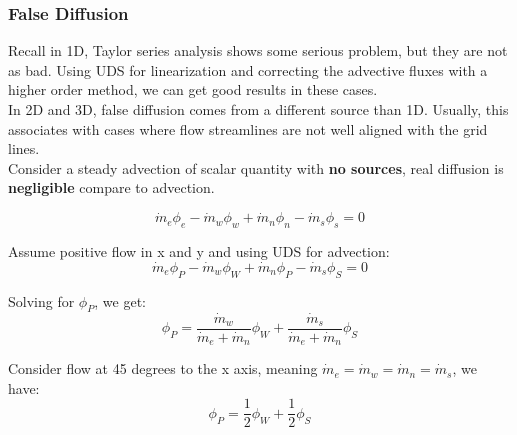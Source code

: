 \documentclass[11pt]{article}
\begin{document}
\subsubsection{False Diffusion}
\label{sec:orge3c6328}
Recall in 1D, Taylor series analysis shows some serious problem, but they are not as bad. Using
UDS for linearization and correcting the advective fluxes with a higher order method, we can get
good results in these cases.\\

In 2D and 3D, false diffusion comes from a different source than 1D. Usually, this associates with
cases where flow streamlines are not well aligned with the grid lines. \\

Consider a steady advection of scalar quantity with \textbf{no sources}, real diffusion is \textbf{negligible} compare
to advection.

\begin{equation*}
\dot{m}_e \phi_e - \dot{m}_w \phi_w + \dot{m}_n \phi_n - \dot{m}_s \phi_s = 0
\end{equation*}    

Assume positive flow in x and y and using UDS for advection:
\begin{equation*}
\dot{m}_e \phi_P - \dot{m}_w\phi_W + \dot{m}_n \phi_P - \dot{m}_s \phi_S = 0
\end{equation*}

Solving for \(\phi_P\), we get:
\begin{equation*}
\phi_P = \frac{\dot{m}_w}{\dot{m}_e+\dot{m}_n}\phi_W +  \frac{\dot{m}_s}{\dot{m}_e+\dot{m}_n}\phi_S
\end{equation*}

Consider flow at 45 degrees to the x axis, meaning \(\dot{m}_e = \dot{m}_w = \dot{m}_n = \dot{m}_s\),
we have:
\begin{equation*}
\phi_P = \frac{1}{2}\phi_W + \frac{1}{2}\phi_S
\end{equation*}
\end{document}
